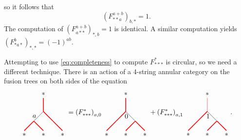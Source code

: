 so it follows that 
	\begin{equation}
		\left(F_{**a}^{a+b}\right)_{b,*}=1.
	\end{equation}
The computation of $\left(F_{a**}^{a+b}\right)_{*,b}=1$ is identical. A similar computation yields $\left(F_{*a*}^{b}\right)_{*,*}=(-1)^{ab}$.

Attempting to use \eqref{eq:completeness} to compute $F_{***}^*$ is circular, so we need a different technique. There is an action of a 4-string annular category on the fusion trees on both sides of the equation
\begin{equation}
\begin{tikzpicture}[scale=0.7,baseline=(current bounding box.center)]
\draw[red,line width=0.4mm] (0,0) -- (0,1) node[pos=1,above,text=black]{$*$};
\draw[] (0,0) -- (-0.707107,-0.707107) node [pos=.5,left] {$a$};
\draw[red,line width=0.4mm] (-0.707107,-0.707107) -- (-1.41421,-1.41421);
\draw[red,line width=0.4mm] (-0.707107,-0.707107) -- (0,-1.41421);
\draw[red,line width=0.4mm] (0,0) -- (0.707107,-0.707107);
\draw[red,line width=0.4mm] (0.707107,-0.707107) -- (1.41421,-1.41421);
\node at (-1.41421,-1.7) {$*$};
\node at (0,-1.7) {$*$};
\node at (1.41421,-1.7) {$*$};
\end{tikzpicture}
=
\left(F_{***}^*\right)_{a,0}
\begin{tikzpicture}[xscale=-1,scale=0.7,baseline=(current bounding box.center)]
\draw[red,line width=0.4mm] (0,0) -- (0,1) node[pos=1,above,text=black]{$*$};
\draw[] (0,0) -- (-0.707107,-0.707107) node [pos=.5,left] {$0$};
\draw[red,line width=0.4mm] (-0.707107,-0.707107) -- (-1.41421,-1.41421);
\draw[red,line width=0.4mm] (-0.707107,-0.707107) -- (0,-1.41421);
\draw[red,line width=0.4mm] (0,0) -- (0.707107,-0.707107);
\draw[red,line width=0.4mm] (0.707107,-0.707107) -- (1.41421,-1.41421);
\node at (-1.41421,-1.7) {$*$};
\node at (0,-1.7) {$*$};
\node at (1.41421,-1.7) {$*$};
\end{tikzpicture}
+
\left(F_{***}^*\right)_{a,1}
\begin{tikzpicture}[xscale=-1,scale=0.7,baseline=(current bounding box.center)]
\draw[red] (0,0) -- (0,1) node[pos=1,above,text=black]{$*$};
\draw[] (0,0) -- (-0.707107,-0.707107) node [pos=.5,left] {$1$};
\draw[red,line width=0.4mm] (-0.707107,-0.707107) -- (-1.41421,-1.41421);
\draw[red,line width=0.4mm] (-0.707107,-0.707107) -- (0,-1.41421);
\draw[red,line width=0.4mm] (0,0) -- (0.707107,-0.707107);
\draw[red,line width=0.4mm] (0.707107,-0.707107) -- (1.41421,-1.41421);
\node at (-1.41421,-1.7) {$*$};
\node at (0,-1.7) {$*$};
\node at (1.41421,-1.7) {$*$};
\end{tikzpicture}.
\end{equation}
